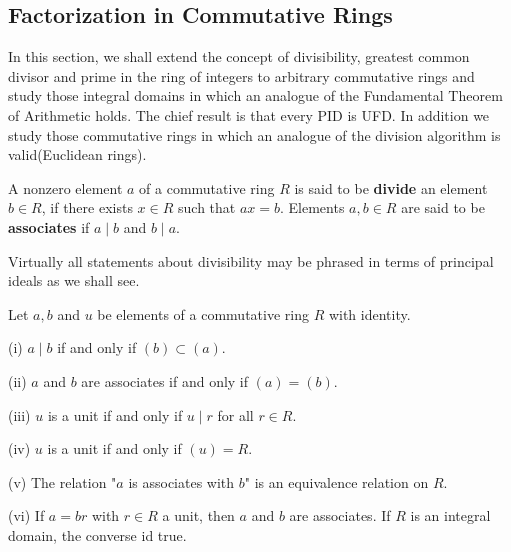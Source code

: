 \subsection{Factorization in Commutative Rings}
In this section, we shall extend the concept of divisibility, greatest common divisor and prime in the ring of integers to arbitrary commutative rings and study those integral domains in which an analogue of the Fundamental Theorem of Arithmetic holds. The chief result is that every PID is UFD. In addition we study those commutative rings in which an analogue of the division algorithm is valid(Euclidean rings).
\begin{definition}
A nonzero element $a$ of a commutative ring $R$ is said to be \textbf{divide} an element $b\in R$, if there exists $x\in R$ such that $ax=b$. Elements $a,b\in R$ are said to be \textbf{associates} if $a\mid b$ and $b\mid a$.
\end{definition}
Virtually all statements about divisibility may be phrased in terms of principal ideals as we shall see.
\begin{theorem}
Let $a,b$ and $u$ be elements of a commutative ring $R$ with identity.\par
(i) $a\mid b$ if and only if $(b)\subset (a)$.\par
(ii) $a$ and $b$ are associates if and only if $(a)=(b)$.\par
(iii) $u$ is a unit if and only if $u\mid r$ for all $r\in R$.\par
(iv) $u$ is a unit if and only if $(u)=R$.\par
(v) The relation "$a$ is associates with $b$" is an equivalence relation on $R$.\par
(vi) If $a=br$ with $r\in R$ a unit, then $a$ and $b$ are associates. If $R$ is an integral domain, the converse id true.
\end{theorem}
